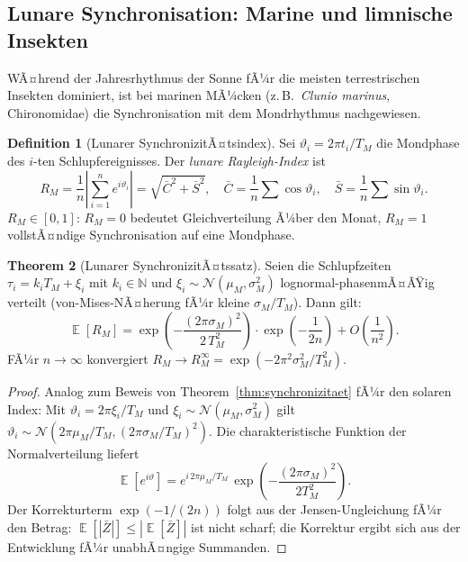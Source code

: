 ﻿\documentclass[12pt, a4paper]{article}
\theoremstyle{definition}
\newtheorem{theorem}{Theorem}[section]
\newtheorem{definition}[theorem]{Definition}
\DeclareMathOperator{\E}{\mathbb{E}}
\newcommand{\N}{\mathbb{N}}
\begin{document}
\subsection{Lunare Synchronisation: Marine und limnische Insekten}

WÃ¤hrend der Jahresrhythmus der Sonne fÃ¼r die meisten terrestrischen Insekten
dominiert, ist bei marinen MÃ¼cken (z.\,B.\ \emph{Clunio marinus}, Chironomidae)
die Synchronisation mit dem Mondrhythmus nachgewiesen.

\begin{definition}[Lunarer SynchronizitÃ¤tsindex]\label{def:R-lunar}
Sei $\vartheta_i = 2\pi t_i/T_M$ die Mondphase des $i$-ten Schlupfereignisses.
Der \emph{lunare Rayleigh-Index} ist
\begin{equation}\label{eq:R-lunar}
  R_M = \frac{1}{n}\left|\sum_{i=1}^n e^{i\vartheta_i}\right|
  = \sqrt{\bar{C}^2 + \bar{S}^2},\quad
  \bar{C} = \frac{1}{n}\sum\cos\vartheta_i,\quad
  \bar{S} = \frac{1}{n}\sum\sin\vartheta_i.
\end{equation}
$R_M \in [0,1]$: $R_M = 0$ bedeutet Gleichverteilung Ã¼ber den Monat,
$R_M = 1$ vollstÃ¤ndige Synchronisation auf eine Mondphase.
\end{definition}

\begin{theorem}[Lunarer SynchronizitÃ¤tssatz]\label{thm:lunar-sync}
Seien die Schlupfzeiten $\tau_i = k_i T_M + \xi_i$ mit $k_i \in \N$ und
$\xi_i \sim \mathcal{N}(\mu_M, \sigma_M^2)$ lognormal-phasenmÃ¤ÃŸig verteilt
(von-Mises-NÃ¤herung fÃ¼r kleine $\sigma_M/T_M$). Dann gilt:
\begin{equation}\label{eq:R-lunar-theo}
  \E[R_M] = \exp\!\left(-\frac{(2\pi\sigma_M)^2}{2\,T_M^2}\right) \cdot\exp\!\left(-\frac{1}{2n}\right)
  + O\!\left(\frac{1}{n^2}\right).
\end{equation}
FÃ¼r $n \to \infty$ konvergiert $R_M \to R_M^{\infty} = \exp\!\left(-2\pi^2\sigma_M^2/T_M^2\right)$.
\end{theorem}

\begin{proof}
Analog zum Beweis von Theorem~\ref{thm:synchronizitaet} fÃ¼r den solaren Index:
Mit $\vartheta_i = 2\pi\xi_i/T_M$ und $\xi_i \sim \mathcal{N}(\mu_M, \sigma_M^2)$
gilt $\vartheta_i \sim \mathcal{N}(2\pi\mu_M/T_M, (2\pi\sigma_M/T_M)^2)$.
Die charakteristische Funktion der Normalverteilung liefert
\[
  \E[e^{i\vartheta}] = e^{i\,2\pi\mu_M/T_M}\,\exp\!\left(-\frac{(2\pi\sigma_M)^2}{2T_M^2}\right).
\]
Der Korrekturterm $\exp(-1/(2n))$ folgt aus der Jensen-Ungleichung fÃ¼r den
Betrag: $\E[|\bar{Z}|] \leq |\E[\bar{Z}]|$ ist nicht scharf; die Korrektur
ergibt sich aus der Entwicklung fÃ¼r unabhÃ¤ngige Summanden. \hfill
\end{proof}
\end{document}
